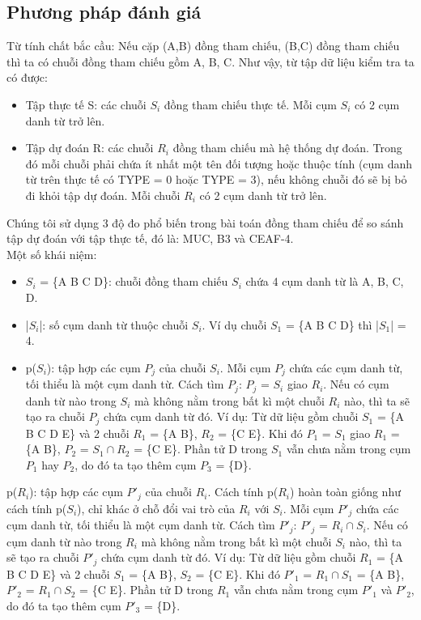 \documentclass[12pt]{report}
\begin{document}
			\subsection*{Phương pháp đánh giá}
				\par Từ tính chất bắc cầu: Nếu cặp (A,B) đồng tham chiếu, (B,C) đồng  tham chiếu thì ta có chuỗi đồng tham chiếu gồm A, B, C. Như vậy, từ tập dữ liệu kiểm tra ta có được:
					\begin{itemize}
				 		\item{Tập thực tế S: các chuỗi $S_i$ đồng tham chiếu thực tế. Mỗi cụm $S_i$ có 2 cụm danh từ trở lên.}				
						\item{Tập dự đoán R: các chuỗi $R_i$ đồng tham chiếu mà hệ thống dự đoán. Trong đó mỗi chuỗi phải chứa ít nhất một tên đối tượng hoặc thuộc tính (cụm danh từ trên thực tế có TYPE = 0 hoặc TYPE = 3), nếu không chuỗi đó sẽ bị bỏ đi khỏi tập dự đoán. Mỗi chuỗi $R_i$ có 2 cụm danh từ trở lên.}
					\end{itemize}
				\par Chúng tôi sử dụng 3 độ đo phổ biến trong bài toán đồng tham chiếu để so sánh tập dự đoán với tập thực tế, đó là: MUC, B3 và CEAF-4.
				\\Một số khái niệm:
					\begin{itemize}
						\item{$S_i$ = \{A B C D\}: chuỗi đồng tham chiếu $S_i$ chứa 4 cụm danh từ là A, B, C, D.}
						\item{|$S_i$|: số cụm danh từ thuộc chuỗi $S_i$. Ví dụ chuỗi $S_1$ = \{A B C D\} thì |$S_1$| = 4.}
						\item{p($S_i$): tập hợp các cụm $P_j$ của chuỗi $S_i$. Mỗi cụm $P_j$ chứa các cụm danh từ, tối thiểu là một cụm danh từ. Cách tìm $P_j$: $P_j$ = $S_i$ giao $R_i$. Nếu có cụm danh từ nào trong $S_i$ mà không nằm trong bất kì một chuỗi $R_i$ nào, thì ta sẽ tạo ra chuỗi $P_j$ chứa cụm danh từ đó. Ví dụ: Từ dữ liệu gồm chuỗi $S_1$ = \{A B C D E\} và 2 chuỗi $R_1$ = \{A B\}, $R_2$ = \{C E\}. Khi đó $P_1$ = $S_1$ giao $R_1$ = \{A B\}, $P_2$ = $S_1 \cap R_2$ = \{C E\}. Phần tử D trong $S_1$ vẫn chưa nằm trong cụm $P_1$ hay $P_2$, do đó ta tạo thêm cụm $P_3$ = \{D\}.}
					\end{itemize}								
				\par p($R_i$): tập hợp các cụm $P'_j$ của chuỗi $R_i$. Cách tính p($R_i$) hoàn toàn giống như cách tính p($S_i$), chỉ khác ở chỗ đổi vai trò của $R_i$ với $S_i$. Mỗi cụm $P'_j$ chứa các cụm danh từ, tối thiểu là một cụm danh từ. Cách tìm $P'_j$: $P'_j$ = $R_i \cap S_i$. Nếu có cụm danh từ nào trong $R_i$ mà không nằm trong bất kì một chuỗi $S_i$ nào, thì ta sẽ tạo ra chuỗi $P'_j$ chứa cụm danh từ đó. Ví dụ: Từ dữ liệu gồm chuỗi $R_1$ = \{A B C D E\} và 2  chuỗi $S_1$ = \{A B\}, $S_2$ = \{C E\}. Khi đó $P'_1$ = $R_1 \cap S_1$ = \{A B\}, $P'_2$ = $R_1 \cap S_2$ = \{C E\}. Phần tử D trong $R_1$ vẫn chưa nằm trong cụm $P'_1$ và $P'_2$, do đó ta tạo thêm cụm $P'_3$ = \{D\}.
\end{document}
